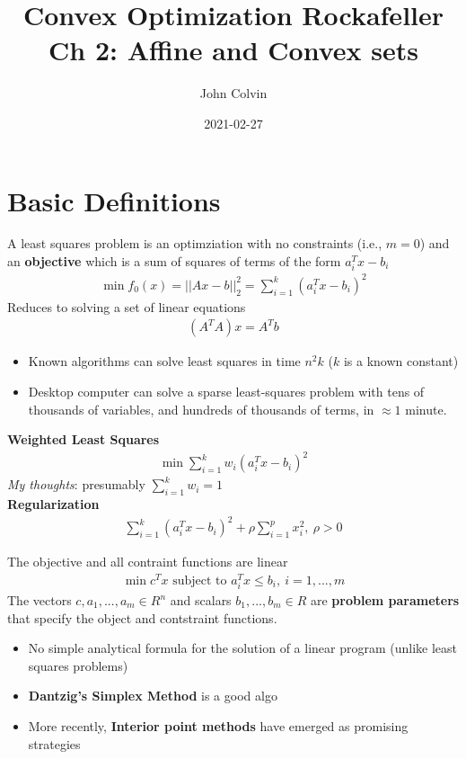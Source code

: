 \documentclass{article}
\title{Convex Optimization Rockafeller Ch 2: Affine and Convex sets}
\date{2021-02-27}
\author{John Colvin}
\begin{document}
\maketitle
\section{Basic Definitions}
\begin{definition}
  A least squares problem is an optimziation with no constraints (i.e., $m=0$)
  and an \textbf{objective} which is a sum of squares of terms of the form $a_i^Tx-b_i$
  \begin{align}
    \min f_0(x)=||Ax-b||_2^2=\sum_{i=1}^k(a_i^Tx-b_i)^2
  \end{align}
  Reduces to solving a set of linear equations
  \begin{align}
    (A^TA)x=A^Tb
  \end{align}
  \begin{itemize}
    \item Known algorithms can solve least squares in time $n^2k$ ($k$ is a known constant)
    \item Desktop computer can solve a sparse least-squares problem with tens of thousands of variables,
          and hundreds of thousands of terms, in $\approx 1$ minute.
  \end{itemize}
  \begin{headered_note}[Variations]
    \textbf{Weighted Least Squares}
    \begin{align}
      \min \sum_{i=1}^k w_i(a_i^Tx-b_i)^2
    \end{align}
    \textit{My thoughts}: presumably $\sum_{i=1}^k w_i=1$\\
    \vpush
    \textbf{Regularization}
    \begin{align}
      \sum_{i=1}^k(a_i^Tx-b_i)^2+\rho \sum_{i=1}^px_i^2,~\rho>0
    \end{align}
  \end{headered_note}
\end{definition}
\begin{definition}
  The objective and all contraint functions are linear
  \begin{align}
    \min c^Tx \text{ subject to }a_i^Tx\leq b_i,~i=1,...,m
  \end{align}
  The vectors $c,a_1,...,a_m\in R^n$ and scalars $b_1,...,b_m\in R$ are
  \textbf{problem parameters} that specify the object and contstraint functions.
  \begin{itemize}
    \item No simple analytical formula for the solution of a linear program
          (unlike least squares problems)
    \item \textbf{Dantzig's Simplex Method} is a good algo
    \item More recently, \textbf{Interior point methods} have emerged as promising strategies
  \end{itemize}
\end{definition}
\end{document}
